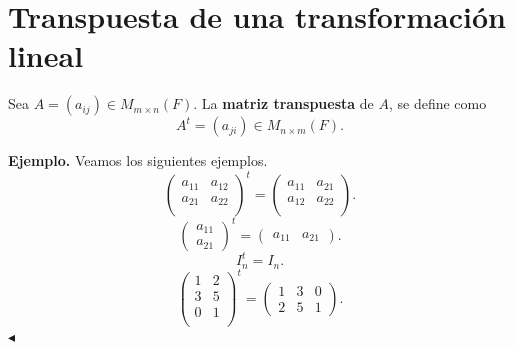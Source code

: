 \documentclass[12pt,a4paper]{book}
\begin{document}
    \section{Transpuesta de una transformación lineal}

    \begin{definicion}
    \label{def:30}
        Sea $A = (a_{ij}) \in M_{m \times n}(F)$. La \textbf{matriz transpuesta} de $A$, se define como
        \begin{equation*}
        A^{t} = (a_{ji}) \in M_{n \times m}(F).
        \end{equation*}
    \end{definicion}


    \textbf{Ejemplo.} Veamos los siguientes ejemplos.
    \begin{equation*}
    \begin{pmatrix}
        a_{11} & a_{12}\\
        a_{21} & a_{22}\\
    \end{pmatrix}^{t} = 
    \begin{pmatrix}
        a_{11} & a_{21}\\
        a_{12} & a_{22}\\
    \end{pmatrix}.
    \end{equation*}
    \begin{equation*}
    \begin{pmatrix}
        a_{11}\\a_{21}
    \end{pmatrix}^{t} = 
    \begin{pmatrix}
        a_{11} & a_{21}
    \end{pmatrix}.
    \end{equation*}
    \begin{equation*}
    I_{n}^{t} = I_{n}.
    \end{equation*}
    \begin{equation*}
    \begin{pmatrix}
        1 & 2\\
        3 & 5\\
        0 & 1\\
    \end{pmatrix}^{t} =
    \begin{pmatrix}
        1 & 3 & 0\\
        2 & 5 & 1
    \end{pmatrix}.
    \end{equation*}
    \hfill $\blacktriangleleft$
\end{document}

